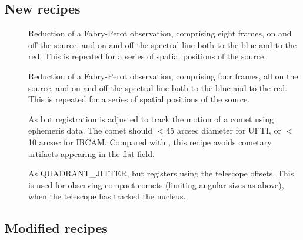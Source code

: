 \documentclass[twoside,11pt,nolof]{starlink}
\begin{document}
\subsection{New recipes}
\begin{description}
   \item []
      Reduction of a Fabry-Perot observation, comprising eight frames,
      on and off the source, and on and off the spectral line both to
      the blue and to the red.  This is repeated for a series of spatial
      positions of the source.
   \item []
      Reduction of a Fabry-Perot observation, comprising four frames,
      all on the source, and on and off the spectral line both to
      the blue and to the red.  This is repeated for a series of spatial
      positions of the source.
   \item []
      As  but registration
      is adjusted to track the motion of a comet using ephemeris
      data.  The comet should $<$45 arcsec diameter for UFTI, or $<$10
      arcsec for IRCAM.  Compared with
      ,
      this recipe avoids cometary artifacts appearing in the flat field.
   \item []
      As QUADRANT\_JITTER, but registers using the telescope offsets.
      This is used for observing compact comets (limiting angular
      sizes as above), when the telescope has tracked the
      nucleus.
\end{description}

\subsection{Modified recipes}
\end{document}
